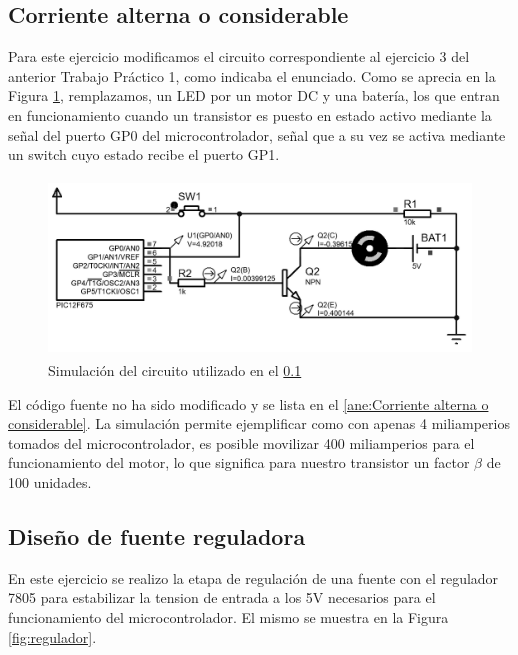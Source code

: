 \documentclass[a4paper]{article}
\newenvironment{ejercicios}
    {\setcounter{secnumdepth}{3}
    \renewcommand\thesubsection{Ejercicio \arabic{subsection}}}
    {\setcounter{secnumdepth}{0}}
\begin{document}
\begin{ejercicios}
    \subsection{Corriente alterna o considerable}\label{ej:Resistor}

    Para este ejercicio modificamos el circuito correspondiente al 
    ejercicio 3 del anterior Trabajo Práctico 1, como indicaba el 
    enunciado. Como se aprecia en la Figura \ref{fig:esquematico5},
    remplazamos, un LED por un motor DC y una batería,
    los que entran en funcionamiento cuando un transistor es puesto en 
    estado activo mediante la señal del puerto GP0 del 
    microcontrolador, señal que a su vez se activa mediante un 
    switch cuyo estado recibe el puerto GP1.
    
    \begin{figure}[h]\centering
        \includegraphics[height=4.7cm]{esquematico5.png}
        \caption{Simulación del circuito utilizado en el  
        \ref{ej:Resistor}}\label{fig:esquematico5}
    \end{figure}

    El código fuente no ha sido modificado y se lista en el 
    \ref{ane:Corriente alterna o considerable}.
    La simulación permite ejemplificar como con apenas 4 miliamperios
    tomados del microcontrolador, es posible movilizar 400 
    miliamperios para el funcionamiento del motor, lo que significa
    para nuestro transistor un factor $\beta$ de 100 unidades.

    \subsection{Diseño de fuente reguladora}

    En este ejercicio se realizo la etapa de regulación de una fuente con el
    regulador 7805 para estabilizar la tension de entrada a los 5V necesarios para el 
    funcionamiento del microcontrolador. El mismo se muestra en la Figura 
    \ref{fig:regulador}.


\end{ejercicios}
\end{document}
